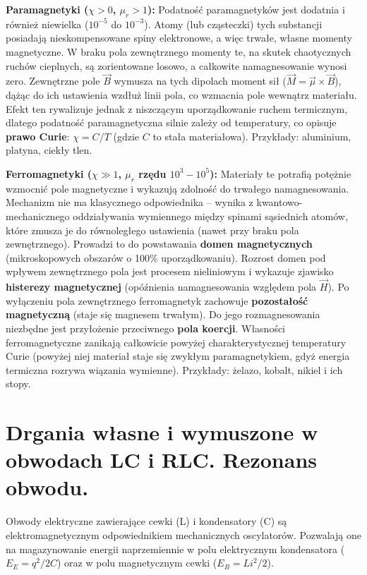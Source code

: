 \documentclass[11pt, a4paper]{article}
\begin{document}
\textbf{Paramagnetyki ($\chi > 0$, $\mu_r > 1$):}
Podatność paramagnetyków jest dodatnia i również niewielka ($10^{-5}$ do $10^{-3}$). Atomy (lub cząsteczki) tych substancji posiadają nieskompensowane spiny elektronowe, a więc trwałe, własne momenty magnetyczne. W braku pola zewnętrznego momenty te, na skutek chaotycznych ruchów cieplnych, są zorientowane losowo, a całkowite namagnesowanie wynosi zero. Zewnętrzne pole $\vec{B}$ wymusza na tych dipolach moment sił ($\vec{M} = \vec{\mu} \times \vec{B}$), dążąc do ich ustawienia wzdłuż linii pola, co wzmacnia pole wewnątrz materiału. Efekt ten rywalizuje jednak z niszczącym uporządkowanie ruchem termicznym, dlatego podatność paramagnetyczna silnie zależy od temperatury, co opisuje \textbf{prawo Curie}: $\chi = C/T$ (gdzie $C$ to stała materiałowa). Przykłady: aluminium, platyna, ciekły tlen.

\textbf{Ferromagnetyki ($\chi \gg 1$, $\mu_r$ rzędu $10^3 - 10^5$):}
Materiały te potrafią potężnie wzmocnić pole magnetyczne i wykazują zdolność do trwałego namagnesowania. Mechanizm nie ma klasycznego odpowiednika – wynika z kwantowo-mechanicznego oddziaływania wymiennego między spinami sąsiednich atomów, które zmusza je do równoległego ustawienia (nawet przy braku pola zewnętrznego). Prowadzi to do powstawania \textbf{domen magnetycznych} (mikroskopowych obszarów o 100\% uporządkowaniu). Rozrost domen pod wpływem zewnętrznego pola jest procesem nieliniowym i wykazuje zjawisko \textbf{histerezy magnetycznej} (opóźnienia namagnesowania względem pola $\vec{H}$). Po wyłączeniu pola zewnętrznego ferromagnetyk zachowuje \textbf{pozostałość magnetyczną} (staje się magnesem trwałym). Do jego rozmagnesowania niezbędne jest przyłożenie przeciwnego \textbf{pola koercji}. Własności ferromagnetyczne zanikają całkowicie powyżej charakterystycznej temperatury Curie (powyżej niej materiał staje się zwykłym paramagnetykiem, gdyż energia termiczna rozrywa wiązania wymienne). Przykłady: żelazo, kobalt, nikiel i ich stopy.

\section{Drgania własne i wymuszone w obwodach LC i RLC. Rezonans obwodu.}

Obwody elektryczne zawierające cewki (L) i kondensatory (C) są elektromagnetycznym odpowiednikiem mechanicznych oscylatorów. Pozwalają one na magazynowanie energii naprzemiennie w polu elektrycznym kondensatora ($E_E = q^2/2C$) oraz w polu magnetycznym cewki ($E_B = Li^2/2$).
\end{document}
